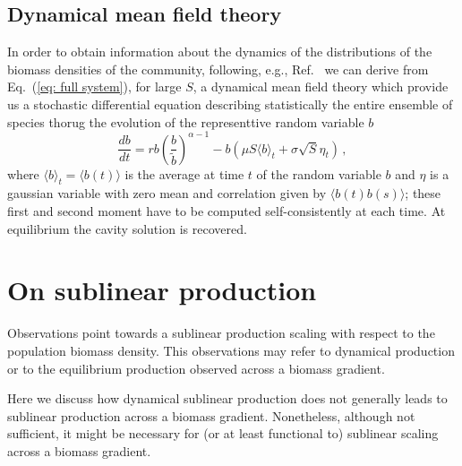 \documentclass[10pt]{article}
\begin{document}
\subsection{Dynamical mean field theory}
In order to obtain information about the dynamics
of the distributions of the biomass densities of the community,
following, e.g., Ref.~\cite{Roy2019} we can derive
from Eq.~(\ref{eq: full system}), for large $S$, 
a dynamical mean field theory which provide us a stochastic differential
equation describing statistically the entire ensemble of species
thorug the evolution of the representtive random variable $b$
\begin{equation}
    \frac{d b}{dt} = rb\left(\frac{b}{\tilde{b}}\right)^{\alpha -1} -
     b\left(\mu S \langle b \rangle_t + \sigma \sqrt{S} \eta_t \right)\, ,
\label{eq: dmft}
\end{equation}
where $\langle b\rangle_t=\langle b(t)\rangle$ is the average at time $t$ of the random variable
$b$ and $\eta$ is a gaussian variable
with zero mean and correlation given by $\langle b(t)b(s)\rangle$; these first and
second moment have to be computed self-consistently at each time. 
At equilibrium the cavity solution is recovered.

\section{On sublinear production}
\label{sec: On sublinear production}
Observations point towards a sublinear production scaling
with respect to the population biomass density. 
This observations may refer to
dynamical production or to the equilibrium production observed
across a biomass gradient.

Here we discuss how dynamical sublinear production does not generally leads to 
sublinear production across a biomass gradient.
Nonetheless, although not sufficient, it might be necessary for (or at least
functional to) sublinear scaling across a biomass gradient.
\end{document}

